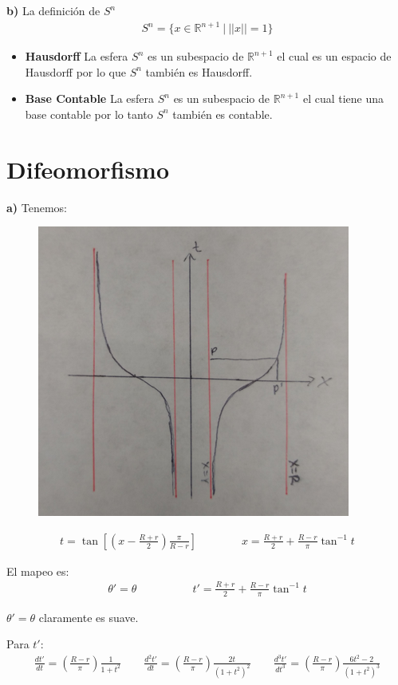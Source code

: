 \documentclass{article}
\begin{document}
\hfill

\textbf{b)} La definición de $ S^n $
\begin{gather*}
  S^n = \{x \in \mathbb{R} ^ {n + 1 } \ |\  || x || = 1\} 
\end{gather*}
\begin{itemize}
  \item \textbf{Hausdorff } La esfera $ S^n  $ es un subespacio de $  \mathbb{R}^ {n+ 1 } $ el cual es un espacio de Hausdorff por lo que $ S^n  $ también es Hausdorff.
  \item \textbf{Base Contable } La esfera $ S^n  $ es un subespacio de $ \mathbb{R}^ {n+1 } $ el cual tiene una base contable por lo tanto $ S^n  $ también es contable.
\end{itemize}




        


\section{Difeomorfismo}

\textbf{a)} Tenemos: 
\begin{figure}[H]
    \centering
    \includegraphics[width=0.40\linewidth]{cilindro.png}
\end{figure}

\begin{gather}
    t = \tan{\left[ \left(x - \frac{R+r }{2}\right)\frac{\pi }{R-r} \right]} \qquad \qquad x = \frac{R+r }{2} + \frac{R - r }{\pi }\tan ^ {-1 } t 
\end{gather}

El mapeo es: 
\begin{gather*}
    \theta' = \theta \qquad \qquad \quad  t' = \frac{R+r }{2} + \frac{R - r }{\pi }\tan ^ {-1 } t 
\end{gather*}

$ \theta' = \theta  $ claramente es suave. 

Para $ t' $:
\begin{gather*}
    \frac{d t' }{d t} = \left(\frac{R-r }{\pi } \right) \frac{1 }{1 + t^2 } \qquad 
    \frac{d ^2 t'  }{d t } =  \left(\frac{R-r }{\pi } \right) \frac{2t }{(1 + t^2)^2 } \qquad 
    \frac{d ^3 t'  }{d t ^3} = \left(\frac{R-r }{\pi } \right) \frac{6t^2 - 2 }{(1 + t^2)^3}
\end{gather*}
\end{document}
